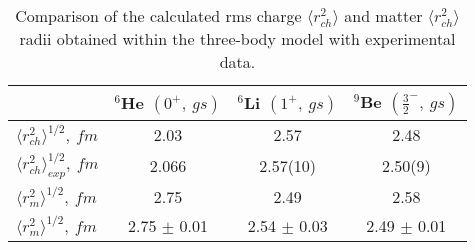 \documentclass[
12pt, %
oneside, %
english, %
doublespacing, %
doublespacing, %
toctotoc, %
parskip, %
headsepline, %
]{MastersDoctoralThesis} %
\begin{document}
\begin{table}[bp]
\caption{ Comparison of the calculated rms charge $\langle r^{2}_{ch}\rangle$ and matter $\langle r^{2}_{ch}\rangle$ radii obtained within the three-body model with experimental data.}
\label{tab:rms_matter}
\begin{tabular*}{\textwidth}{@{\extracolsep{\fill}}lccc@{}}
\toprule
 & $^6$He                                                                                                                                                  $(0^+,~gs)$ & $^6$Li                                                                                                                                                                                                                                                                                                  $(1^+,~gs)$  & $^9$Be                                                                                                                                                                                                                                                                                                  $(\frac{3}{2}^-,~gs)$  \\
\midrule
$\langle r^{2}_{ch}\rangle^{1/2},~fm$ & 2.03 & 2.57   & 2.48 \\
$\langle r^{2}_{ch}\rangle^{1/2}_{exp},~fm$
& 2.066 \cite{angeli2013table} & 2.57(10) \cite{bumiller1972elastic}   & 2.50(9) \cite{fey1973nuclear} \\
\midrule
$\langle r^{2}_{m}\rangle^{1/2},~fm$& 2.75 & 2.49   & 2.58 \\
$\langle r^{2}_{m}\rangle^{1/2},~fm$  \cite{tanihata1985measurements}  
& 2.75 $\pm$ 0.01
& 2.54 $\pm$ 0.03 
& 2.49 $\pm$ 0.01  \\

  \bottomrule
\end{tabular*}
\end{table}
\end{document}
